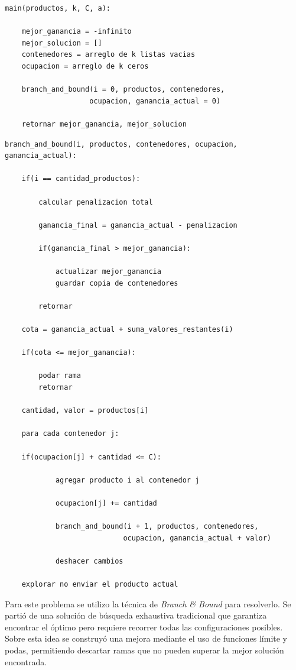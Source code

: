 \documentclass[12pt]{article}
\begin{document}
\begin{lstlisting}[style=pseudo]
main(productos, k, C, a):

    mejor_ganancia = -infinito
    mejor_solucion = []
    contenedores = arreglo de k listas vacias
    ocupacion = arreglo de k ceros

    branch_and_bound(i = 0, productos, contenedores,
                    ocupacion, ganancia_actual = 0)

    retornar mejor_ganancia, mejor_solucion
\end{lstlisting}


{\small
\begin{lstlisting}[style=pseudo]
branch_and_bound(i, productos, contenedores, ocupacion, ganancia_actual):

    if(i == cantidad_productos):

        calcular penalizacion total

        ganancia_final = ganancia_actual - penalizacion

        if(ganancia_final > mejor_ganancia):

            actualizar mejor_ganancia
            guardar copia de contenedores

        retornar

    cota = ganancia_actual + suma_valores_restantes(i)

    if(cota <= mejor_ganancia):

        podar rama
        retornar

    cantidad, valor = productos[i]
    
    para cada contenedor j:
    
    if(ocupacion[j] + cantidad <= C):

            agregar producto i al contenedor j

            ocupacion[j] += cantidad

            branch_and_bound(i + 1, productos, contenedores,
                            ocupacion, ganancia_actual + valor)

            deshacer cambios

    explorar no enviar el producto actual
\end{lstlisting}

}

            Para este problema se utilizo la técnica de \textit{Branch \& Bound} para resolverlo. Se partió de una solución de búsqueda exhaustiva tradicional que garantiza encontrar el óptimo pero requiere recorrer todas las configuraciones posibles. Sobre esta idea se construyó una mejora mediante el uso de funciones límite y podas, permitiendo descartar ramas que no pueden superar la mejor solución encontrada.
\end{document}
